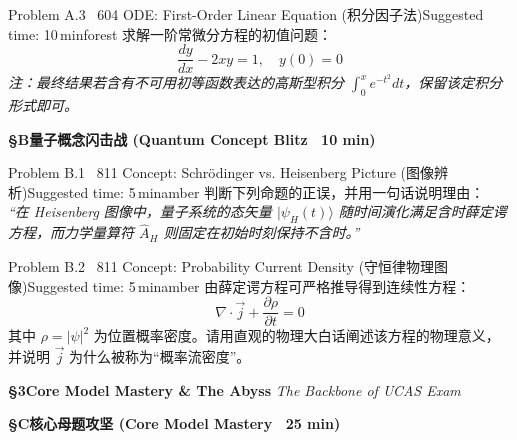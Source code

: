 \documentclass[a4paper,11pt]{article}
\begin{document}
\vspace{3pt}

\begin{problembox}{Problem A.3 \textbar\ 604 ODE: First-Order Linear Equation (积分因子法)}{Suggested time: 10\,min}{forest}
求解一阶常微分方程的初值问题：
\[
  \frac{dy}{dx} - 2x y = 1, \quad y(0) = 0
\]
\textit{注：最终结果若含有不可用初等函数表达的高斯型积分 $\int_0^x e^{-t^2}dt$，保留该定积分形式即可。}
\end{problembox}

\vspace{6pt}
{\normalsize\sffamily\bfseries\color{amber} \S B\quad 量子概念闪击战 (Quantum Concept Blitz \textperiodcentered\ 10 min)}
\vspace{2pt}

\begin{problembox}{Problem B.1 \textbar\ 811 Concept: Schrödinger vs. Heisenberg Picture (图像辨析)}{Suggested time: 5\,min}{amber}
判断下列命题的正误，并用一句话说明理由：\\
\textit{“在 Heisenberg 图像中，量子系统的态矢量 $|\psi_H(t)\rangle$ 随时间演化满足含时薛定谔方程，而力学量算符 $\hat{A}_H$ 则固定在初始时刻保持不含时。”}
\end{problembox}

\vspace{3pt}

\begin{problembox}{Problem B.2 \textbar\ 811 Concept: Probability Current Density (守恒律物理图像)}{Suggested time: 5\,min}{amber}
由薛定谔方程可严格推导得到连续性方程：
\[
  \nabla \cdot \vec{j} + \frac{\partial \rho}{\partial t} = 0
\]
其中 $\rho = |\psi|^2$ 为位置概率密度。请用直观的物理大白话阐述该方程的物理意义，并说明 $\vec{j}$ 为什么被称为“概率流密度”。
\end{problembox}

\clearpage

{\Large\sffamily\bfseries\color{navy} \S 3\quad Core Model Mastery \& The Abyss}
\hfill{\small\sffamily\color{mist}\itshape The Backbone of UCAS Exam}

\vspace{8pt}

{\normalsize\sffamily\bfseries\color{teal} \S C\quad 核心母题攻坚 (Core Model Mastery \textperiodcentered\ 25 min)}
\vspace{3pt}
\end{document}
